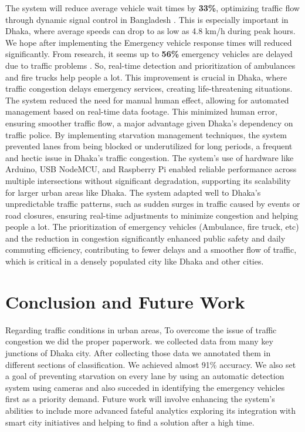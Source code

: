 \documentclass[conference]{IEEEtran}
\begin{document}
 
The system will reduce average vehicle wait times by \textbf{33\%}, optimizing traffic flow through dynamic signal control in Bangladesh \cite{clar:a10}. This is especially important in Dhaka, where average speeds can drop to as low as 4.8 km/h during peak hours\cite{clar:a1}. We hope after implementing the Emergency vehicle response times will reduced significantly. From research, it seems up to \textbf{56\%}  emergency vehicles are delayed due to traffic problems \cite{clar:a11}. So, real-time detection and prioritization of ambulances and fire trucks help people a lot. This improvement is crucial in Dhaka, where traffic congestion delays emergency services, creating life-threatening situations. The system reduced the need for manual human effect, allowing for automated management based on real-time data footage. This minimized human error, ensuring smoother traffic flow, a major advantage given Dhaka’s dependency on traffic police. By implementing starvation management techniques, the system prevented lanes from being blocked or underutilized for long periods, a frequent and hectic issue in Dhaka’s traffic congestion. The system’s use of hardware like Arduino, USB NodeMCU, and Raspberry Pi enabled reliable performance across multiple intersections without significant degradation, supporting its scalability for larger urban areas like Dhaka. The system adapted well to Dhaka’s unpredictable traffic patterns, such as sudden surges in traffic caused by events or road closures, ensuring real-time adjustments to minimize congestion and helping people a lot. The prioritization of emergency vehicles (Ambulance, fire truck, etc) and the reduction in congestion significantly enhanced public safety and daily commuting efficiency, contributing to fewer delays and a smoother flow of traffic, which is critical in a densely populated city like Dhaka and other cities.

\section{Conclusion and Future Work}
Regarding traffic conditions in urban areas, To overcome the issue of traffic congestion we did the proper paperwork. we collected data from many key junctions of Dhaka city. After collecting those data we annotated them in different sections of classification. We achieved almost 91\% accuracy. We also set a goal of preventing starvation on every lane by using an automatic detection system using cameras and also succeded in identifying the emergency vehicles first as a priority demand. Future work will involve enhancing the system’s abilities to include more advanced fateful analytics exploring its integration with smart city initiatives and helping to find a solution after a high time.
\end{document}
